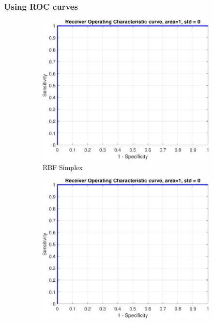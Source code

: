 \documentclass{article}
\begin{document}
        \subsubsection{Using ROC curves}
            \begin{figure}[h]
                 \centering
                 \begin{subfigure}[b]{0.3\textwidth}
                     \centering
                     \includegraphics[width=\textwidth]{Assignment 1/figures/simplex_rbf_classifier_roc.pdf}
                    \caption{RBF Simplex}
                     \label{fig:roc_rbf_simplex_tuned}
                 \end{subfigure}
                 \hfill
                 \begin{subfigure}[b]{0.3\textwidth}
                     \centering
                     \includegraphics[width=\textwidth]{Assignment 1/figures/gridsearch_rbf_classifier_roc.pdf}

\end{subfigure}
\end{figure}
\end{document}
